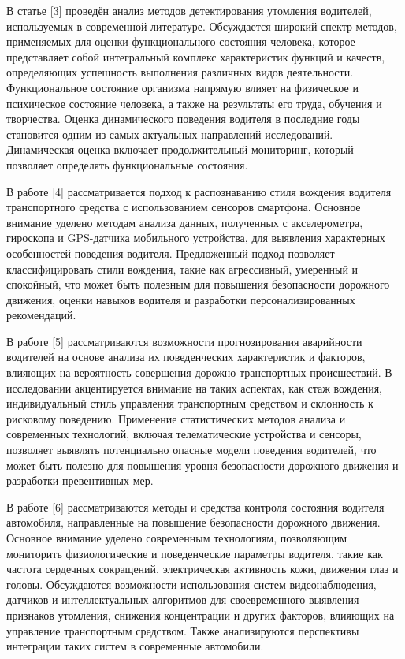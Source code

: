 \documentclass[
]{article}
\begin{document}
В статье {[}3{]} проведён анализ методов детектирования утомления
водителей, используемых в современной литературе. Обсуждается широкий
спектр методов, применяемых для оценки функционального состояния
человека, которое представляет собой интегральный комплекс характеристик
функций и качеств, определяющих успешность выполнения различных видов
деятельности. Функциональное состояние организма напрямую влияет на
физическое и психическое состояние человека, а также на результаты его
труда, обучения и творчества. Оценка динамического поведения водителя в
последние годы становится одним из самых актуальных направлений
исследований. Динамическая оценка включает продолжительный мониторинг,
который позволяет определять функциональные состояния.

В работе {[}4{]} рассматривается подход к распознаванию стиля вождения
водителя транспортного средства с использованием сенсоров смартфона.
Основное внимание уделено методам анализа данных, полученных с
акселерометра, гироскопа и GPS-датчика мобильного устройства, для
выявления характерных особенностей поведения водителя. Предложенный
подход позволяет классифицировать стили вождения, такие как агрессивный,
умеренный и спокойный, что может быть полезным для повышения
безопасности дорожного движения, оценки навыков водителя и разработки
персонализированных рекомендаций.

В работе {[}5{]} рассматриваются возможности прогнозирования аварийности
водителей на основе анализа их поведенческих характеристик и факторов,
влияющих на вероятность совершения дорожно-транспортных происшествий. В
исследовании акцентируется внимание на таких аспектах, как стаж
вождения, индивидуальный стиль управления транспортным средством и
склонность к рисковому поведению. Применение статистических методов
анализа и современных технологий, включая телематические устройства и
сенсоры, позволяет выявлять потенциально опасные модели поведения
водителей, что может быть полезно для повышения уровня безопасности
дорожного движения и разработки превентивных мер.

В работе {[}6{]} рассматриваются методы и средства контроля состояния
водителя автомобиля, направленные на повышение безопасности дорожного
движения. Основное внимание уделено современным технологиям, позволяющим
мониторить физиологические и поведенческие параметры водителя, такие как
частота сердечных сокращений, электрическая активность кожи, движения
глаз и головы. Обсуждаются возможности использования систем
видеонаблюдения, датчиков и интеллектуальных алгоритмов для
своевременного выявления признаков утомления, снижения концентрации и
других факторов, влияющих на управление транспортным средством. Также
анализируются перспективы интеграции таких систем в современные
автомобили.
\end{document}
